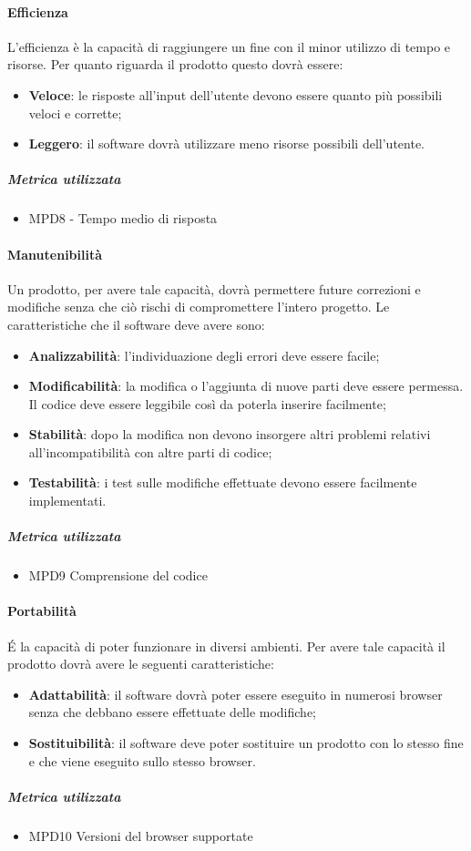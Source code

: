 \paragraph{Efficienza}
L'efficienza è la capacità di raggiungere un fine con il minor utilizzo di tempo e risorse. Per quanto riguarda il prodotto questo dovrà essere:
\begin{itemize}
\item \textbf{Veloce}: le risposte all'input dell'utente devono essere quanto più possibili veloci e corrette;
\item \textbf{Leggero}: il software dovrà utilizzare meno risorse possibili dell'utente.
\end{itemize}
\subparagraph{Metrica utilizzata}
\begin{itemize}
\item MPD8 - Tempo medio di risposta
\end{itemize}
\paragraph{Manutenibilità}
Un prodotto, per avere tale capacità, dovrà permettere future correzioni e modifiche senza che ciò rischi di compromettere l'intero progetto. Le caratteristiche che il software deve avere sono:
\begin{itemize}
\item \textbf{Analizzabilità}: l'individuazione degli errori deve essere facile;
\item \textbf{Modificabilità}: la modifica o l'aggiunta di nuove parti deve essere permessa. Il codice deve essere leggibile così da poterla inserire facilmente;
\item \textbf{Stabilità}: dopo la modifica non devono insorgere altri problemi relativi all'incompatibilità con altre parti di codice;
\item \textbf{Testabilità}: i test sulle modifiche effettuate devono essere facilmente implementati.
\end{itemize}
\subparagraph{Metrica utilizzata}
\begin{itemize}
\item MPD9 Comprensione del codice
\end{itemize}
\paragraph{Portabilità}
\'E la capacità di poter funzionare in diversi ambienti. Per avere tale capacità il prodotto dovrà avere le seguenti caratteristiche:
\begin{itemize}
\item \textbf{Adattabilità}: il software dovrà poter essere eseguito in numerosi browser senza che debbano essere effettuate delle modifiche;
\item \textbf{Sostituibilità}: il software deve poter sostituire un prodotto con lo stesso fine e che viene eseguito sullo stesso browser. 
\end{itemize}
\subparagraph{Metrica utilizzata}
\begin{itemize}
\item MPD10 Versioni del browser supportate
\end{itemize}

